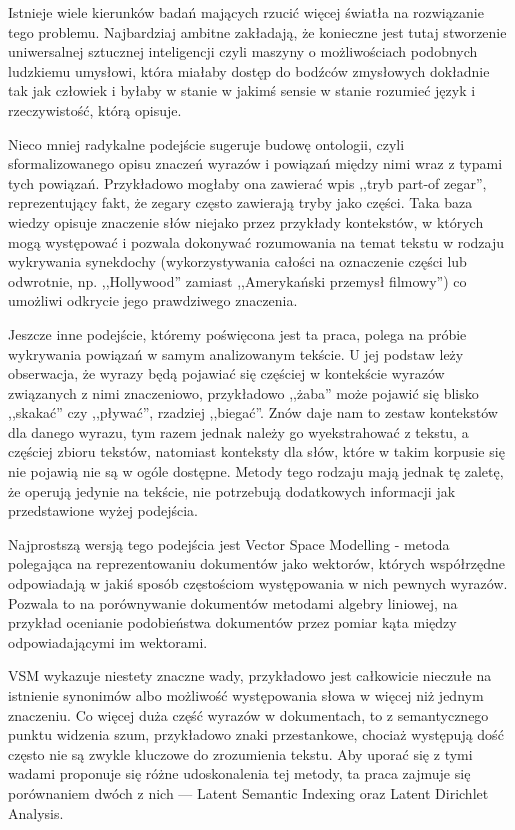 \documentclass[11pt,a4paper]{article}
\begin{document}
Istnieje wiele kierunków badań mających rzucić więcej światła na rozwiązanie
tego problemu. Najbardziaj ambitne zakładają, że konieczne jest tutaj
stworzenie uniwersalnej sztucznej inteligencji czyli maszyny o możliwościach
podobnych ludzkiemu umysłowi, która miałaby dostęp do bodźców zmysłowych
dokładnie tak jak człowiek i byłaby w stanie w jakimś sensie w stanie rozumieć
język i rzeczywistość, którą opisuje.

Nieco mniej radykalne podejście sugeruje budowę ontologii, czyli
sformalizowanego opisu znaczeń wyrazów i powiązań między nimi wraz z typami
tych powiązań. Przykładowo mogłaby ona zawierać wpis ,,tryb part-of zegar'',
reprezentujący fakt, że zegary często zawierają tryby jako części. Taka baza
wiedzy opisuje znaczenie słów niejako przez przykłady kontekstów, w których
mogą występować i pozwala dokonywać rozumowania na temat tekstu w rodzaju
wykrywania synekdochy (wykorzystywania całości na oznaczenie części lub
odwrotnie, np. ,,Hollywood'' zamiast ,,Amerykański przemysł filmowy'') co
umożliwi odkrycie jego prawdziwego znaczenia.

Jeszcze inne podejście, któremy poświęcona jest ta praca, polega na próbie
wykrywania powiązań w samym analizowanym tekście. U jej podstaw leży
obserwacja, że wyrazy będą pojawiać się częściej w kontekście wyrazów
związanych z nimi znaczeniowo, przykładowo ,,żaba'' może pojawić się blisko
,,skakać'' czy ,,pływać'', rzadziej ,,biegać''. Znów daje nam to zestaw
kontekstów dla danego wyrazu, tym razem jednak należy go wyekstrahować z
tekstu, a częściej zbioru tekstów, natomiast konteksty dla słów, które w takim
korpusie się nie pojawią nie są w ogóle dostępne. Metody tego rodzaju mają
jednak tę zaletę, że operują jedynie na tekście, nie potrzebują dodatkowych
informacji jak przedstawione wyżej podejścia.

Najprostszą wersją tego podejścia jest Vector Space Modelling - metoda
polegająca na reprezentowaniu dokumentów jako wektorów, których współrzędne
odpowiadają w jakiś sposób częstościom występowania w nich pewnych wyrazów.
Pozwala to na porównywanie dokumentów metodami algebry liniowej, na przykład
ocenianie podobieństwa dokumentów przez pomiar kąta między odpowiadającymi im
wektorami.

VSM wykazuje niestety znaczne wady, przykładowo jest całkowicie nieczułe na
istnienie synonimów albo możliwość występowania słowa w więcej niż jednym
znaczeniu. Co więcej duża część wyrazów w dokumentach, to z semantycznego
punktu widzenia szum, przykładowo znaki przestankowe, chociaż występują dość
często nie są zwykle kluczowe do zrozumienia tekstu. Aby uporać się z tymi
wadami proponuje się różne udoskonalenia tej metody, ta praca zajmuje się
porównaniem dwóch z nich --- Latent Semantic Indexing oraz Latent Dirichlet
Analysis.
\end{document}
